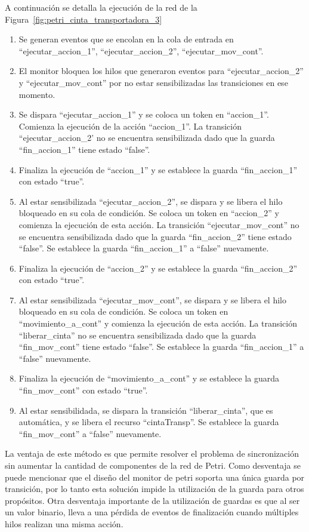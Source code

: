 A continuación se detalla la ejecución de la red de la
Figura~\ref{fig:petri_cinta_transportadora_3}
\begin{enumerate}
    \item Se generan eventos que se encolan en la cola de entrada en
    ``ejecutar\_accion\_1'', ``ejecutar\_accion\_2'', ``ejecutar\_mov\_cont''.
	\item El monitor bloquea los hilos que generaron eventos para
	``ejecutar\_accion\_2'' y ``ejecutar\_mov\_cont'' por no estar sensibilizadas
	las transiciones en ese momento.
	\item Se dispara ``ejecutar\_accion\_1'' y se coloca un token en ``accion\_1''.
	Comienza la ejecución de la acción ``accion\_1''. La transición
	``ejecutar\_accion\_2' no se encuentra sensibilizada dado que la guarda
	``fin\_accion\_1'' tiene estado ``false''.
	\item Finaliza la ejecución de ``accion\_1'' y se establece la guarda
	``fin\_accion\_1'' con estado ``true''.
	\item Al estar sensibilizada ``ejecutar\_accion\_2'', se dispara y se libera el hilo
	bloqueado en su cola de condición. Se coloca un token en ``accion\_2'' y
	comienza la ejecución de esta acción. La transición ``ejecutar\_mov\_cont'' no
	se encuentra sensibilizada dado que la guarda ``fin\_accion\_2'' tiene estado
	``false''.
	Se establece la guarda ``fin\_accion\_1'' a ``false'' nuevamente.
	\item Finaliza la ejecución de ``accion\_2'' y se establece la guarda
	``fin\_accion\_2'' con estado ``true''.
	\item Al estar sensibilizada ``ejecutar\_mov\_cont'', se dispara y se libera
	el hilo bloqueado en su cola de condición. Se coloca un token en
	``movimiento\_a\_cont'' y comienza la ejecución de esta acción. La transición
	``liberar\_cinta'' no se encuentra sensibilizada dado que la guarda
	``fin\_mov\_cont'' tiene estado ``false''.
	Se establece la guarda ``fin\_accion\_1'' a ``false'' nuevamente.
	\item Finaliza la ejecución de ``movimiento\_a\_cont'' y se establece la guarda
	``fin\_mov\_cont'' con estado ``true''.
	\item Al estar sensibilidada, se dispara la transición ``liberar\_cinta'', que es
	automática, y se libera el recurso ``cintaTransp''. Se establece la guarda
	``fin\_mov\_cont'' a ``false'' nuevamente.
\end{enumerate}

La ventaja de este método es que permite resolver el problema de sincronización
sin aumentar la cantidad de componentes de la red de Petri.
Como desventaja se puede mencionar que el diseño
del monitor de petri soporta una única guarda por transición, por lo tanto esta
solución impide la utilización de la guarda para otros propósitos. Otra
desventaja importante de la utilización de guardas es que al ser un valor
binario, lleva a una pérdida de eventos de finalización cuando
múltiples hilos realizan una misma acción.

